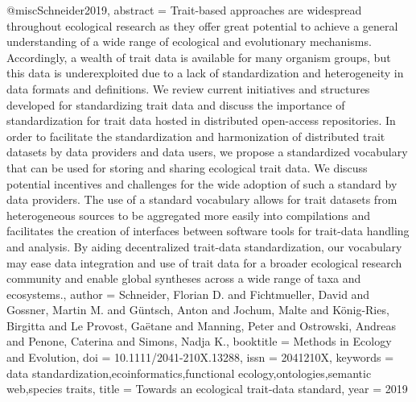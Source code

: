 {{{{{@misc{Schneider2019,
abstract = {Trait-based approaches are widespread throughout ecological research as they offer great potential to achieve a general understanding of a wide range of ecological and evolutionary mechanisms. Accordingly, a wealth of trait data is available for many organism groups, but this data is underexploited due to a lack of standardization and heterogeneity in data formats and definitions. We review current initiatives and structures developed for standardizing trait data and discuss the importance of standardization for trait data hosted in distributed open-access repositories. In order to facilitate the standardization and harmonization of distributed trait datasets by data providers and data users, we propose a standardized vocabulary that can be used for storing and sharing ecological trait data. We discuss potential incentives and challenges for the wide adoption of such a standard by data providers. The use of a standard vocabulary allows for trait datasets from heterogeneous sources to be aggregated more easily into compilations and facilitates the creation of interfaces between software tools for trait-data handling and analysis. By aiding decentralized trait-data standardization, our vocabulary may ease data integration and use of trait data for a broader ecological research community and enable global syntheses across a wide range of taxa and ecosystems.},
author = {Schneider, Florian D. and Fichtmueller, David and Gossner, Martin M. and G{\"{u}}ntsch, Anton and Jochum, Malte and K{\"{o}}nig-Ries, Birgitta and {Le Provost}, Ga{\"{e}}tane and Manning, Peter and Ostrowski, Andreas and Penone, Caterina and Simons, Nadja K.},
booktitle = {Methods in Ecology and Evolution},
doi = {10.1111/2041-210X.13288},
issn = {2041210X},
keywords = {data standardization,ecoinformatics,functional ecology,ontologies,semantic web,species traits},
title = {{Towards an ecological trait-data standard}},
year = {2019}
}

}}}}}
